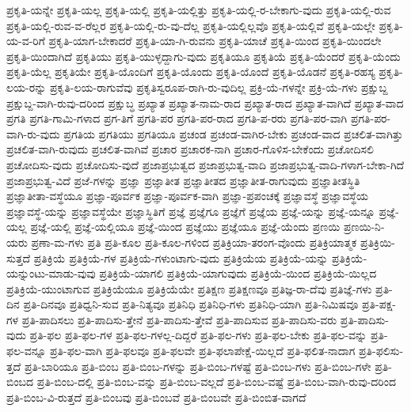 {ಪ್ರಕೃತಿ-ಯನ್ನೇ
ಪ್ರಕೃತಿ-ಯಲ್ಲ
ಪ್ರಕೃತಿ-ಯಲ್ಲಿ
ಪ್ರಕೃತಿ-ಯಲ್ಲಿತ್ತು
ಪ್ರಕೃತಿ-ಯಲ್ಲಿ-ರ-ಬೇಕಾಗು-ವುದು
ಪ್ರಕೃತಿ-ಯಲ್ಲಿ-ರುವ
ಪ್ರಕೃತಿ-ಯಲ್ಲಿ-ರುವ-ವ-ರೆಲ್ಲರ
ಪ್ರಕೃತಿ-ಯಲ್ಲಿ-ರು-ವು-ದೆಲ್ಲ
ಪ್ರಕೃತಿ-ಯಲ್ಲಿಲ್ಲವೊ
ಪ್ರಕೃತಿ-ಯಲ್ಲಿವೆ
ಪ್ರಕೃತಿ-ಯಲ್ಲೇ
ಪ್ರಕೃತಿ-ಯ-ವ-ರಿಗೆ
ಪ್ರಕೃತಿ-ಯಾಗ-ಬೇಕಾದರೆ
ಪ್ರಕೃತಿ-ಯಾ-ಗಿ-ರುವನು
ಪ್ರಕೃತಿ-ಯಾಚೆ
ಪ್ರಕೃತಿ-ಯಿಂದ
ಪ್ರಕೃತಿ-ಯಿಂದಲೇ
ಪ್ರಕೃತಿ-ಯಿಂದಾಗಿದೆ
ಪ್ರಕೃತಿಯು
ಪ್ರಕೃತಿ-ಯುಳ್ಳದ್ದಾಗು-ವುದು
ಪ್ರಕೃತಿಯೂ
ಪ್ರಕೃತಿಯೆ
ಪ್ರಕೃತಿ-ಯೆಂದರೆ
ಪ್ರಕೃತಿ-ಯೆಂದು
ಪ್ರಕೃತಿ-ಯೆಲ್ಲ
ಪ್ರಕೃತಿಯೇ
ಪ್ರಕೃತಿ-ಯೊಂದಿಗೆ
ಪ್ರಕೃತಿ-ಯೊಂದು
ಪ್ರಕೃತಿ-ಯೊಂದೆ
ಪ್ರಕೃತಿ-ಯೊಡನೆ
ಪ್ರಕೃತಿ-ರಹಸ್ಯ
ಪ್ರಕೃತಿ-ಲಯ-ರನ್ನು
ಪ್ರಕೃತಿ-ಲಯ-ರಾಗುವೆವು
ಪ್ರಕೃತಿಸ್ವರೂಪ-ರಾಗಿ-ರು-ವುದಿಲ್ಲ
ಪ್ರಕ್ರಿ-ಯೆ-ಗಳನ್ನೇ
ಪ್ರಕ್ರಿ-ಯೆ-ಗಳು
ಪ್ರಕ್ಷುಬ್ದ
ಪ್ರಕ್ಷುಬ್ದ-ವಾಗಿ-ರುವು-ದರಿಂದ
ಪ್ರಕ್ಷುಬ್ಧ
ಪ್ರಖ್ಯಾತ
ಪ್ರಖ್ಯಾತ-ನಾಮ-ರಾದ
ಪ್ರಖ್ಯಾತ-ರಾದ
ಪ್ರಖ್ಯಾತ-ವಾಗಿದೆ
ಪ್ರಖ್ಯಾತ-ವಾದ
ಪ್ರಗತಿ
ಪ್ರಗತಿ-ಗಾಮಿ-ಗಳಾದ
ಪ್ರಗ-ತಿಗೆ
ಪ್ರಗತಿ-ಪರ
ಪ್ರಗತಿ-ಪರ-ರಾದ
ಪ್ರಗತಿ-ಪ-ರರು
ಪ್ರಗತಿ-ಪರ-ವಾಗಿ
ಪ್ರಗತಿ-ಪರ-ವಾಗಿ-ರು-ವುದು
ಪ್ರಗತಿಯ
ಪ್ರಗತಿಯು
ಪ್ರಗತಿಯೂ
ಪ್ರಚಂಡ
ಪ್ರಚಂಡ-ವಾಗಿರ-ಬೇಕು
ಪ್ರಚಂಡ-ವಾದ
ಪ್ರಚಲಿತ-ವಾಗಿತ್ತು
ಪ್ರಚಲಿತ-ವಾಗಿ-ರುವುದು
ಪ್ರಚಲಿತ-ವಾಗಿವೆ
ಪ್ರಚಾರ
ಪ್ರಚಾರಕ-ನಾಗಿ
ಪ್ರಚಾರ-ಗೊಳಿಸ-ಬೇಕೆಂದು
ಪ್ರಚೋದಿಸಲಿ
ಪ್ರಚೋದಿಸು-ವುದು
ಪ್ರಚೋದಿಸು-ವುದೆ
ಪ್ರಜಾಪ್ರಭುತ್ವದ
ಪ್ರಜಾಪ್ರಭುತ್ವ-ವಾದಿ
ಪ್ರಜಾಪ್ರಭುತ್ವ-ವಾದಿ-ಗಳಾಗ-ಬೇಕಾ-ಗಿದೆ
ಪ್ರಜಾಪ್ರಭುತ್ವ-ವಿದೆ
ಪ್ರಜೆ-ಗಳನ್ನು
ಪ್ರಜ್ಞಾ
ಪ್ರಜ್ಞಾತೀತ
ಪ್ರಜ್ಞಾತೀತದ
ಪ್ರಜ್ಞಾತೀತ-ರಾಗುವುದು
ಪ್ರಜ್ಞಾತೀತಸ್ಥಿತಿ
ಪ್ರಜ್ಞಾತೀತಾ-ವಸ್ಥೆಯೂ
ಪ್ರಜ್ಞಾ-ಪೂರ್ವಕ
ಪ್ರಜ್ಞಾ-ಪೂರ್ವಕ-ವಾಗಿ
ಪ್ರಜ್ಞಾ-ಪ್ರಪಂಚಕ್ಕೆ
ಪ್ರಜ್ಞಾವಸ್ಥೆ
ಪ್ರಜ್ಞಾವಸ್ಥೆಯ
ಪ್ರಜ್ಞಾವಸ್ಥೆ-ಯನ್ನು
ಪ್ರಜ್ಞಾವಸ್ಥೆಯೇ
ಪ್ರಜ್ಞಾಸ್ಥಿತಿಗೆ
ಪ್ರಜ್ಞೆ
ಪ್ರಜ್ಞೆಗೂ
ಪ್ರಜ್ಞೆಗೆ
ಪ್ರಜ್ಞೆಯ
ಪ್ರಜ್ಞೆ-ಯನ್ನು
ಪ್ರಜ್ಞೆ-ಯನ್ನೂ
ಪ್ರಜ್ಞೆ-ಯಲ್ಲ
ಪ್ರಜ್ಞೆ-ಯಲ್ಲಿ
ಪ್ರಜ್ಞೆ-ಯಲ್ಲಿಯೂ
ಪ್ರಜ್ಞೆ-ಯಿಂದ
ಪ್ರಜ್ಞೆಯು
ಪ್ರಜ್ಞೆಯೂ
ಪ್ರಜ್ಞೆ-ಯೆಂದು
ಪ್ರಣಯಿ
ಪ್ರಣಯಿ-ನಿ-ಯರು
ಪ್ರಣಾ-ಮ-ಗಳು
ಪ್ರತಿ
ಪ್ರತಿ-ಕೂಲ
ಪ್ರತಿ-ಕೂಲ-ಗಳಿಂದ
ಪ್ರತಿಕ್ರಿಯಾ-ತರಂಗ-ವೊಂದು
ಪ್ರತಿಕ್ರಿಯಾತ್ಮಕ
ಪ್ರತಿಕ್ರಿಯಿ-ಸುತ್ತದೆ
ಪ್ರತಿಕ್ರಿಯೆ
ಪ್ರತಿಕ್ರಿಯೆ-ಗಳ
ಪ್ರತಿಕ್ರಿಯೆ-ಗಳುಂಟಾಗು-ವುದು
ಪ್ರತಿಕ್ರಿಯೆಯ
ಪ್ರತಿಕ್ರಿಯೆ-ಯನ್ನು
ಪ್ರತಿಕ್ರಿಯೆ-ಯನ್ನುಂಟು-ಮಾಡು-ವುವು
ಪ್ರತಿಕ್ರಿಯೆ-ಯಾಗಲಿ
ಪ್ರತಿಕ್ರಿಯೆ-ಯಾಗುವುದು
ಪ್ರತಿಕ್ರಿಯೆ-ಯಿಂದ
ಪ್ರತಿಕ್ರಿಯೆ-ಯಿಲ್ಲದ
ಪ್ರತಿಕ್ರಿಯೆ-ಯುಂಟಾಗುವ
ಪ್ರತಿಕ್ರಿಯೆಯೂ
ಪ್ರತಿಕ್ರಿಯೆಯೇ
ಪ್ರತಿಕ್ಷಣ
ಪ್ರತಿಕ್ಷಣವೂ
ಪ್ರತಿಜ್ಞ-ರಾ-ದೆವು
ಪ್ರತಿಜ್ಞೆ-ಗಳು
ಪ್ರತಿ-ದಿನ
ಪ್ರತಿ-ದಿನವೂ
ಪ್ರತಿಧ್ವನಿ-ಸುವ
ಪ್ರತಿ-ನಿತ್ಯವೂ
ಪ್ರತಿನಿಧಿ
ಪ್ರತಿನಿಧಿ-ಗಳು
ಪ್ರತಿನಿಧಿ-ಯಾಗಿ
ಪ್ರತಿ-ನಿಮಿಷವೂ
ಪ್ರತಿ-ಪಕ್ಷ-ಗಳ
ಪ್ರತಿ-ಪಾದಿಸಲು
ಪ್ರತಿ-ಪಾದಿಸು-ತ್ತೇನೆ
ಪ್ರತಿ-ಪಾದಿಸು-ತ್ತೇವೆ
ಪ್ರತಿ-ಪಾದಿಸುವ
ಪ್ರತಿ-ಪಾದಿಸು-ವರು
ಪ್ರತಿ-ಪಾದಿಸು-ವುದು
ಪ್ರತಿ-ಫಲ
ಪ್ರತಿ-ಫಲ-ಗಳ
ಪ್ರತಿ-ಫಲ-ಗಳಲ್ಲ-ದಿದ್ದರೆ
ಪ್ರತಿ-ಫಲ-ಗಳು
ಪ್ರತಿ-ಫಲ-ಬೇಕು
ಪ್ರತಿ-ಫಲ-ವನ್ನು
ಪ್ರತಿ-ಫಲ-ವನ್ನೂ
ಪ್ರತಿ-ಫಲ-ವಾಗಿ
ಪ್ರತಿ-ಫಲವೂ
ಪ್ರತಿ-ಫಲವೇ
ಪ್ರತಿ-ಫಲಾಪೇಕ್ಷೆ-ಯಿಲ್ಲದೆ
ಪ್ರತಿ-ಫಲಿತ-ನಾದಾಗ
ಪ್ರತಿ-ಫಲಿಸು-ತ್ತದೆ
ಪ್ರತಿ-ಬಾರಿಯೂ
ಪ್ರತಿ-ಬಿಂಬ
ಪ್ರತಿ-ಬಿಂಬ-ಗಳನ್ನು
ಪ್ರತಿ-ಬಿಂಬ-ಗಳಷ್ಟೆ
ಪ್ರತಿ-ಬಿಂಬ-ಗಳು
ಪ್ರತಿ-ಬಿಂಬ-ಗಳೇ
ಪ್ರತಿ-ಬಿಂಬದ
ಪ್ರತಿ-ಬಿಂಬ-ದಲ್ಲಿ
ಪ್ರತಿ-ಬಿಂಬ-ವನ್ನು
ಪ್ರತಿ-ಬಿಂಬ-ವಲ್ಲದೆ
ಪ್ರತಿ-ಬಿಂಬ-ವಷ್ಟೆ
ಪ್ರತಿ-ಬಿಂಬ-ವಾಗಿ-ರುವು-ದರಿಂದ
ಪ್ರತಿ-ಬಿಂಬ-ವಿ-ರುತ್ತದೆ
ಪ್ರತಿ-ಬಿಂಬವು
ಪ್ರತಿ-ಬಿಂಬವೆ
ಪ್ರತಿ-ಬಿಂಬವೇ
ಪ್ರತಿ-ಬಿಂಬಿತ-ವಾಗದೆ
}
